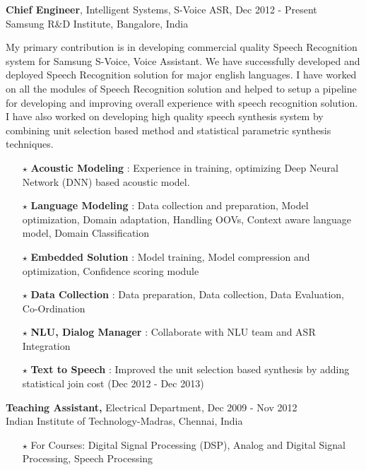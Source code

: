 \documentclass[line,margin]{res}
\begin{document}
\begin{resume}
\normalsize
 {\bf Chief Engineer}, Intelligent Systems, S-Voice ASR, \hfill Dec 2012 - Present\\
 \hfill Samsung R\&D Institute, Bangalore, India
\small

My primary contribution is in developing commercial quality Speech Recognition system for Samsung S-Voice, Voice Assistant. We have successfully developed and deployed Speech Recognition solution for major english languages. I have worked on all the modules of Speech Recognition solution and helped to setup a pipeline for developing and improving overall experience with speech recognition solution. I have also worked on developing high quality speech synthesis system by combining unit selection based method and statistical parametric synthesis techniques.

\begin{itemize} \itemsep -1pt  %
\small
	\item[$\star$] {\bf Acoustic Modeling}   : Experience in training, optimizing Deep Neural Network (DNN) based acoustic model.
	\item[$\star$] {\bf Language Modeling}   : Data collection and preparation, Model optimization, Domain adaptation, Handling OOVs, Context aware language model, Domain Classification
	\item[$\star$] {\bf Embedded Solution}   : Model training, Model compression and optimization, Confidence scoring module
	\item[$\star$] {\bf Data Collection} 	   : Data preparation, Data collection, Data Evaluation, Co-Ordination
	\item[$\star$] {\bf NLU, Dialog Manager} : Collaborate with NLU team and ASR Integration
	\item[$\star$] {\bf Text to Speech}      : Improved the unit selection based synthesis by adding statistical join cost (Dec 2012 - Dec 2013)
\end{itemize}

\normalsize
  {\bf Teaching Assistant,} Electrical Department, \hfill Dec 2009 - Nov 2012\\
 \hfill Indian Institute of Technology-Madras, Chennai, India
 
\begin{itemize} \itemsep -2pt  %
\small
	\item[$\star$] For Courses: Digital Signal Processing (DSP), Analog and Digital Signal Processing, Speech Processing
\end{itemize}


\end{resume}
\end{document}
